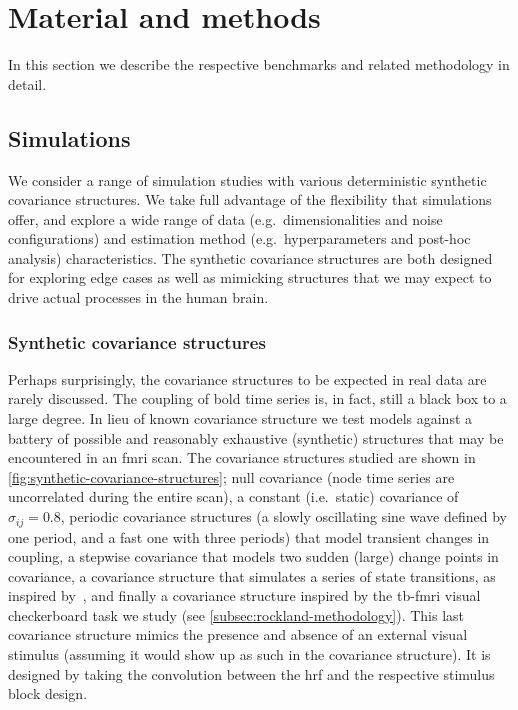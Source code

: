 \clearpage
\section{Material and methods}\label{sec:simulations-methodology}

In this section we describe the respective benchmarks and related methodology in detail.

\subsection{Simulations}\label{subsec:simulations-methods}

We consider a range of simulation studies with various deterministic synthetic covariance structures.
We take full advantage of the flexibility that simulations offer, and explore a wide range of data (e.g.~dimensionalities and noise configurations) and estimation method (e.g.~hyperparameters and post-hoc analysis) characteristics.
The synthetic covariance structures are both designed for exploring edge cases as well as mimicking structures that we may expect to drive actual processes in the human brain.

\subsubsection{Synthetic covariance structures}\label{subsec:synthetic-covariance-structures}

Perhaps surprisingly, the covariance structures to be expected in real data are rarely discussed.
The coupling of \gls{bold} time series is, in fact, still a black box to a large degree.
In lieu of known covariance structure we test models against a battery of possible and reasonably exhaustive (synthetic) structures that may be encountered in an \gls{fmri} scan.
The covariance structures studied are shown in \cref{fig:synthetic-covariance-structures};
null covariance (node time series are uncorrelated during the entire scan),
a constant (i.e.~static) covariance of $\sigma_{ij} = 0.8$,
periodic covariance structures (a slowly oscillating sine wave defined by one period, and a fast one with three periods) that model transient changes in coupling,
a stepwise covariance that models two sudden (large) change points in covariance,
a covariance structure that simulates a series of state transitions, as inspired by~\textcite{Thompson2018},
and finally a covariance structure inspired by the \gls{tb-fmri} visual checkerboard task we study (see \cref{subsec:rockland-methodology}).
This last covariance structure mimics the presence and absence of an external visual stimulus (assuming it would show up as such in the covariance structure).
It is designed by taking the convolution between the \gls{hrf} and the respective stimulus block design.


